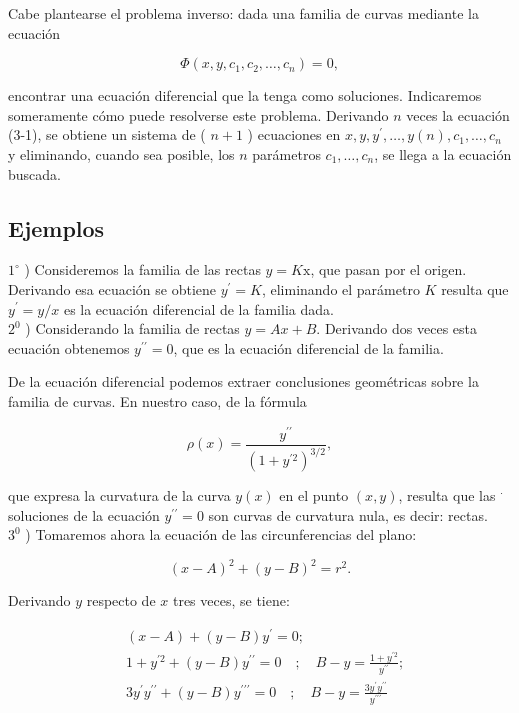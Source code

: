 \documentclass[10pt]{article}
\theoremstyle{plain}
\theoremstyle{definition}
\theoremstyle{remark}
\begin{document}
Cabe plantearse el problema inverso: dada una familia de curvas mediante la ecuación


\begin{equation*}
\Phi\left(x, y, c_{1}, c_{2}, \ldots, c_{n}\right)=0, \tag{3-1}
\end{equation*}


encontrar una ecuación diferencial que la tenga como soluciones. Indicaremos someramente cómo puede resolverse este problema. Derivando $n$ veces la ecuación (3-1), se obtiene un sistema de ( $n+1$ ) ecuaciones en $x, y, y^{\prime}, \ldots, y(n), c_{1}, \ldots, c_{n}$ y eliminando, cuando sea posible, los $n$ parámetros $c_{1}, \ldots, c_{n}$, se llega a la ecuación buscada.

\subsection{Ejemplos}
$1^{\circ}$ ) Consideremos la familia de las rectas $y=K \mathrm{x}$, que pasan por el origen. Derivando esa ecuación se obtiene $y^{\prime}=K$, eliminando el parámetro $K$ resulta que $y^{\prime}=y / x$ es la ecuación diferencial de la familia dada.\\
$2^{0}$ ) Considerando la familia de rectas $y=A x+B$. Derivando dos veces esta ecuación obtenemos $y^{\prime \prime}=0$, que es la ecuación diferencial de la familia.

De la ecuación diferencial podemos extraer conclusiones geométricas sobre la familia de curvas. En nuestro caso, de la fórmula

$$
\rho(x)=\frac{y^{\prime \prime}}{\left(1+y^{\prime 2}\right)^{3 / 2}},
$$

que expresa la curvatura de la curva $y(x)$ en el punto $(x, y)$, resulta que las ${ }^{\cdot}$ soluciones de la ecuación $y^{\prime \prime}=0$ son curvas de curvatura nula, es decir: rectas.\\
$3^{0}$ ) Tomaremos ahora la ecuación de las circunferencias del plano:

$$
(x-A)^{2}+(y-B)^{2}=r^{2} .
$$

Derivando $y$ respecto de $x$ tres veces, se tiene:

$$
\begin{aligned}
& (x-A)+(y-B) y^{\prime}=0 ; \\
& 1+y^{\prime 2}+(y-B) y^{\prime \prime}=0 \quad ; \quad B-y=\frac{1+y^{\prime 2}}{y^{\prime \prime}} ; \\
& 3 y^{\prime} y^{\prime \prime}+(y-B) y^{\prime \prime \prime}=0 \quad ; \quad B-y=\frac{3 y^{\prime} y^{\prime \prime}}{y^{\prime \prime \prime}}
\end{aligned}
$$
\end{document}
